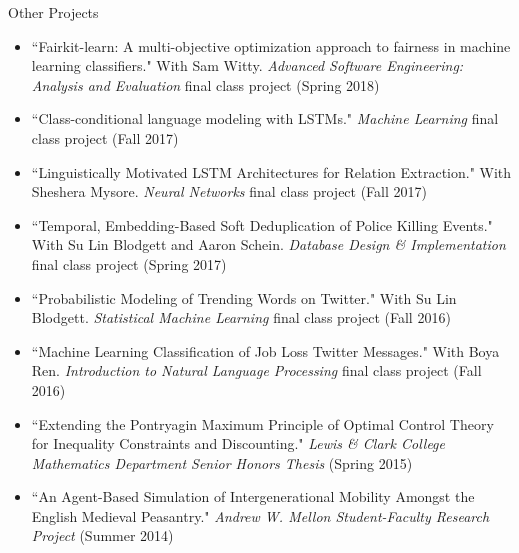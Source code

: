 \documentclass{resume} %
\begin{document}
\begin{rSection}{Other Projects}

 \begin{itemize}
 \item ``Fairkit-learn:  A multi-objective optimization approach to fairness in machine learning classifiers." With Sam Witty. \emph{Advanced Software Engineering: Analysis and Evaluation} final class project (Spring 2018) 
 \item ``Class-conditional language modeling with LSTMs." \emph{Machine Learning} final class project (Fall 2017)
 \item ``Linguistically Motivated LSTM Architectures for Relation Extraction." With Sheshera Mysore. \emph{Neural Networks} final class project (Fall 2017)  
 \item ``Temporal, Embedding-Based Soft Deduplication of Police Killing Events." With Su Lin Blodgett and Aaron Schein. \emph{Database Design \& Implementation} final class project (Spring 2017)  
 \item  ``Probabilistic Modeling of Trending Words on Twitter." With Su Lin Blodgett.  \emph{Statistical Machine Learning} final class project (Fall 2016)  
 \item ``Machine Learning Classification of Job Loss Twitter Messages." With Boya Ren. \emph{Introduction to Natural Language Processing} final class project (Fall 2016) 
 \item ``Extending the Pontryagin Maximum Principle of Optimal Control Theory for Inequality Constraints and Discounting." \emph{Lewis \& Clark College Mathematics Department Senior Honors Thesis} (Spring 2015)
 \item ``An Agent-Based Simulation of Intergenerational Mobility Amongst the English Medieval Peasantry." \emph{Andrew W. Mellon Student-Faculty Research Project} (Summer 2014) 
 \end{itemize} 

\end{rSection}



\end{document}
